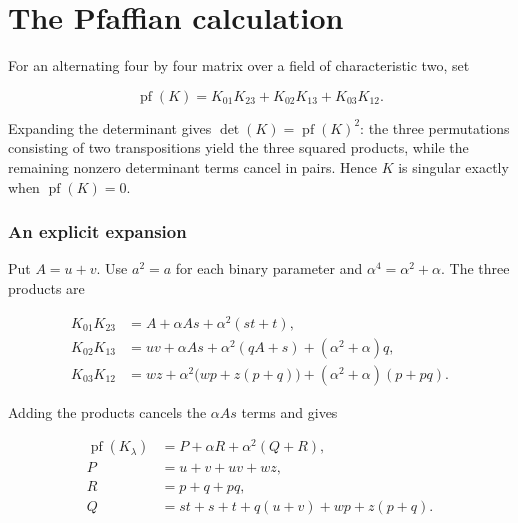 \documentclass[11pt,a4paper]{article}
\DeclareMathOperator{\pf}{pf}
\theoremstyle{definition}
\begin{document}
\section{The Pfaffian calculation}\label{sec:pfaffian}

For an alternating four by four matrix over a field of characteristic two, set


\begin{equation}\label{eq:31}
\pf(K)=K_{01}K_{23}+K_{02}K_{13}+K_{03}K_{12}.
\end{equation}

Expanding the determinant gives $\operatorname{det}(K) = \operatorname{pf}(K)^{2}$: the three permutations consisting of two transpositions yield the three squared products, while the remaining nonzero determinant terms cancel in pairs. Hence $K$ is singular exactly when $\operatorname{pf}(K)=0$.


\subsubsection*{An explicit expansion}

Put $A=u+v$. Use $a^{2}=a$ for each binary parameter and $\alpha ^{4}=\alpha ^{2}+\alpha $. The three products are


\begin{equation}\label{eq:35}
\begin{aligned}K_{01}K_{23}&=A+\alpha As+\alpha^2(st+t),\\K_{02}K_{13}&=uv+\alpha As+\alpha^2(qA+s)+(\alpha^2+\alpha)q,\\K_{03}K_{12}&=wz+\alpha^2\bigl(wp+z(p+q)\bigr)+(\alpha^2+\alpha)(p+pq).\end{aligned}
\end{equation}

Adding the products cancels the $\alpha As$ terms and gives


\begin{equation}\label{eq:37}
\begin{aligned}\pf(K_\lambda)&=P+\alpha R+\alpha^2(Q+R),\\P&=u+v+uv+wz,\\R&=p+q+pq,\\Q&=st+s+t+q(u+v)+wp+z(p+q).\end{aligned}
\end{equation}
\end{document}
